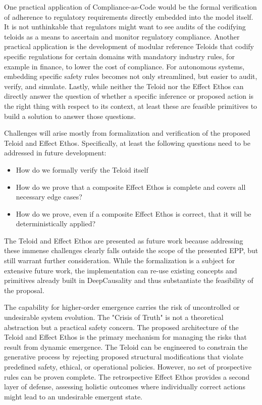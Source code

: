 One practical application of Compliance-as-Code would be the formal verification of adherence to regulatory requirements
directly embedded into the model itself. It is not unthinkable that regulators might want to see audits of the codifying
teloids as a means to ascertain and monitor regulatory compliance. Another practical application is the development of
modular reference Teloids that codify specific regulations for certain domains with mandatory industry rules,
for example in finance, to lower the cost of compliance. For autonomous systems, embedding specific safety rules
becomes not only streamlined, but easier to audit, verify, and simulate. Lastly, while neither the Teloid nor the Effect
Ethos can directly answer the question of whether a specific inference or proposed action is the right thing
with respect to its context, at least these are feasible primitives to build a solution to answer those questions.

Challenges will arise mostly from formalization and verification of the proposed Teloid and Effect Ethos. Specifically,
at least the following questions need to be addressed in future development:

\begin{itemize}
    \item How do we formally verify the Teloid itself
    \item How do we prove that a composite Effect Ethos is complete and covers all necessary edge cases?
    \item How do we prove, even if a composite Effect Ethos is correct, that it will be deterministically applied?
\end{itemize}

The Teloid and Effect Ethos are presented as future work because addressing these immense challenges clearly
falls outside the scope of the presented EPP, but still warrant further consideration. 
While the formalization is
a subject for extensive future work, the implementation can re-use existing concepts and primitives already built in
DeepCausality and thus substantiate the feasibility of the proposal.


The capability for higher-order emergence carries the risk of uncontrolled or undesirable system evolution. The "Crisis of Truth" is not a theoretical abstraction but a practical safety concern. The proposed architecture of the Teloid and Effect Ethos is the primary mechanism for managing the risks that result from dynamic emergence. The Teloid can be engineered to constrain the generative process by rejecting proposed structural modifications that violate predefined safety, ethical, or operational policies. However, no set of prospective rules can be proven complete. The retrospective Effect Ethos provides a second layer of defense, assessing holistic outcomes where individually correct actions might lead to an undesirable emergent state. 

